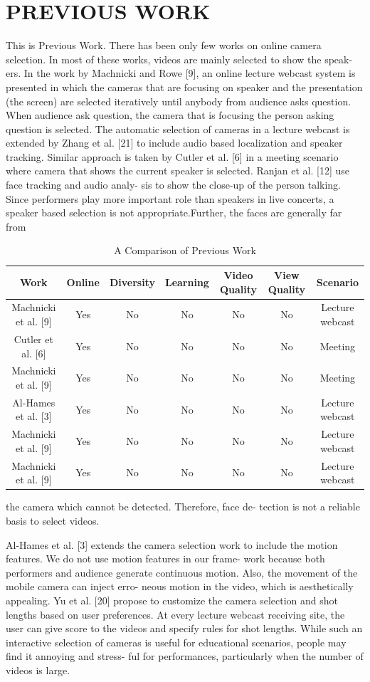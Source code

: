 \documentclass{sig-alternate-05-2015}
\begin{document}
\section{PREVIOUS WORK}
This is Previous Work.
There has been only few works on online camera selection. In
most of these works, videos are mainly selected to show the speak-
ers. In the work by Machnicki and Rowe [9], an online lecture
webcast system is presented in which the cameras that are focusing
on speaker and the presentation (the screen) are selected iteratively
until anybody from audience asks question. When audience ask
question, the camera that is focusing the person asking question is
selected. The automatic selection of cameras in a lecture webcast
is extended by Zhang et al. [21] to include audio based localization
and speaker tracking. Similar approach is taken by Cutler et al. [6]
in a meeting scenario where camera that shows the current speaker
is selected. Ranjan et al. [12] use face tracking and audio analy-
sis to show the close-up of the person talking. Since performers
play more important role than speakers in live concerts, a speaker
based selection is not appropriate.Further, the faces are generally
far from\par
\begin{table}
\begin{center}
\caption{ A Comparison of Previous Work}
\begin{tabular}{|c|c|c|c|c|c|c|}
\hline
Work  & Online & Diversity& Learning & Video Quality & View Quality & Scenario\\
\hline
Machnicki et al. [9] & Yes & No& No& No& No& Lecture webcast\\
\hline
Cutler et al. [6] & Yes & No& No& No& No& Meeting\\
\hline
Machnicki et al. [9] & Yes & No& No& No& No& Meeting\\
\hline
Al-Hames et al. [3] & Yes & No& No& No& No& Lecture webcast\\
\hline
Machnicki et al. [9] & Yes & No& No& No& No& Lecture webcast\\
\hline
Machnicki et al. [9] & Yes & No& No& No& No& Lecture webcast\\
\hline
\end{tabular}
\end{center}
\end{table}
the camera which cannot be detected. Therefore, face de-
tection is not a reliable basis to select videos.

Al-Hames et al. [3] extends the camera selection work to include
the motion features. We do not use motion features in our frame-
work because both performers and audience generate continuous
motion. Also, the movement of the mobile camera can inject erro-
neous motion in the video, which is aesthetically appealing. Yu et
al. [20] propose to customize the camera selection and shot lengths
based on user preferences. At every lecture webcast receiving site,
the user can give score to the videos and specify rules for shot
lengths. While such an interactive selection of cameras is useful
for educational scenarios, people may find it annoying and stress-
ful for performances, particularly when the number of videos is
large.
\end{document}
